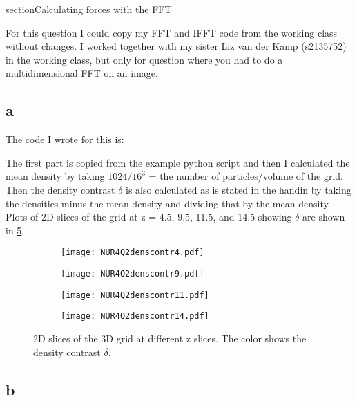 section{Calculating forces with the FFT}

For this question I could copy my FFT and IFFT code from the working class without changes. 
I worked together with my sister Liz van der Kamp (s2135752) in the working class, but only for question where you had to do a multidimensional FFT on an image. 

\subsection*{a}

The code I wrote for this is:


The first part is copied from the example python script and then I calculated the mean density by taking $1024/16^3$ = the number of particles/volume of the grid. Then the density contrast $\delta$ is also calculated as is stated in the handin by taking the densities minus the mean density and dividing that by the mean density. 
Plots of 2D slices of the grid at z = 4.5, 9.5, 11.5, and 14.5 showing $\delta$ are shown in \ref{fig:fig21}.

\begin{figure}[ht]
    \begin{subfigure}{.49\textwidth}
       \centering
    \texttt{[image: NUR4Q2denscontr4.pdf]}
    \centering
    \label{}
    \end{subfigure}
    \hfill
    \begin{subfigure}{.49\textwidth}
       \centering
    \texttt{[image: NUR4Q2denscontr9.pdf]}
    \centering
    \label{}
    \end{subfigure}
     \begin{subfigure}{.49\textwidth}
       \centering
    \texttt{[image: NUR4Q2denscontr11.pdf]}
    \centering
    \label{}
    \end{subfigure}
     \begin{subfigure}{.49\textwidth}
       \centering
    \texttt{[image: NUR4Q2denscontr14.pdf]}
    \centering
    \label{}
    \end{subfigure}
    \caption{2D slices of the 3D grid at different z slices. The color shows the density contrast $\delta$.}
    \label{fig:fig21}
\end{figure}

\subsection*{b}

